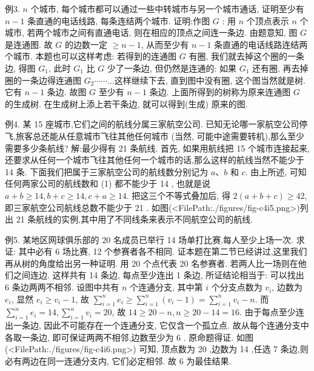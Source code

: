例3. $n$ 个城市, 每个城市都可以通过一些中转城市与另一个城市通话, 证明至少有 $n-1$ 条直通的电话线路, 每条连结两个城市.
证明:作图 $G$ : 用 $n$ 个顶点表示 $n$ 个城市, 若两个城市之间有直通电话, 则在相应的顶点之间连一条边.
由题意知, 图 $G$ 是连通图.
故 $G$ 的边数一定 $\geqslant n-1$, 从而至少有 $n-1$ 条直通的电话线路连结两个城市.
本题也可以这样考虑: 若得到的连通图 $G$ 有圈, 我们就去掉这个圈的一条边, 得图 $G_1$, 此时 $G_1$ 比 $G$ 少了一条边, 但仍然是连通的: 如果 $G_1$ 还有圈, 再去掉圈的一条边得连通图 $G_2 \cdots \cdots$...这样继续下去, 直到图中没有圈, 这个图当然就是树.
它有 $n-1$ 条边.
故图 $G$ 至少有 $n-1$ 条边.
上面所得到的树称为原来连通图 $G$ 的生成树.
在生成树上添上若干条边, 就可以得到(生成) 原来的图.



例4. 某 15 座城市,它们之间的航线分属三家航空公司.
已知无论哪一家航空公司停飞,旅客总还能从任意城市飞往其他任何城市 (当然, 可能中途需要转机),那么至少需要多少条航线?
解:最少得有 21 条航线.
首先, 如果用航线把 15 个城市连接起来, 还要求从任何一个城市飞往其他任何一个城市的话,那么这样的航线当然不能少于 14 条.
下面我们把属于三家航空公司的航线数分别记为 $a 、 b$ 和 $c$. 由上所述, 可知任何两家公司的航线数和
(1) 都不能少于 14 , 也就是说 $a+b \geqslant 14, b+ c \geqslant 14, c+a \geqslant 14$. 把这三个不等式叠加后, 得 $2(a+b+c) \geqslant 42$, 即三家航空公司航线总数不能少于 21 .
如图(<FilePath:./figures/fig-c4i5.png>)列出 21 条航线的实例,其中用了不同线条来表示不同航空公司的航线.



例5. 某地区网球俱乐部的 20 名成员已举行 14 场单打比赛,每人至少上场一次.
求证: 其中必有 6 场比赛, 12 个参赛者各不相同.
证本题在第二节已经讲过,这里我们再从树的角度给出另一种证明.
用 20 个点代表 20 名参赛者.
若两人比一场则在他们之间连边.
这样共有 14 条边, 每点至少连出 1 条边, 所证结论相当于: 可以找出 6 条边两两不相邻.
设图中共有 $n$ 个连通分支, 其中第 $i$ 个分支点数为 $v_i$, 边数为 $e_i$, 显然 $e_i \geqslant v_i-1$, 故 $\sum_{i=1}^n e_i \geqslant \sum_{i=1}^n\left(v_i-1\right)=\sum_{i=1}^n v_i-n$. 而 $\sum_{i=1}^n e_i=14, \sum_{i=1}^n v_i=20$, 故 $14 \geqslant 20-n, n \geqslant 20-14=16$. 由于每点至少连出一条边, 因此不可能存在一个连通分支, 它仅含一个孤立点.
故从每个连通分支中各取一条边, 即可保证两两不相邻,边数至少为 6 . 原命题得证.
如图(<FilePath:./figures/fig-c4i6.png>) 可知, 顶点数为 20 ,边数为 14 ,任选 7 条边,则必有两边在同一连通分支内, 它们必定相邻.
故 6 为最佳结果.



